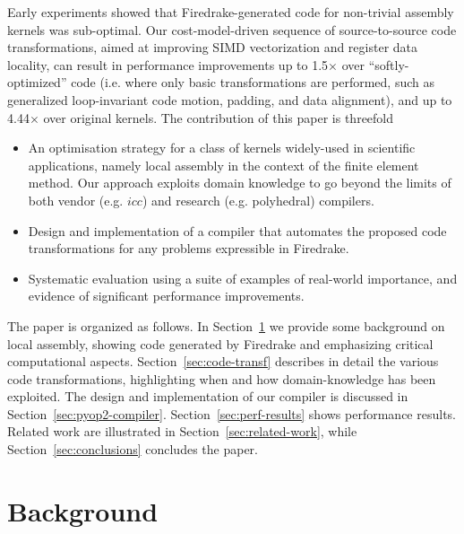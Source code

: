\documentclass[conference]{IEEEtran}
\begin{document}
Early experiments showed that Firedrake-generated code for non-trivial assembly kernels was sub-optimal. Our cost-model-driven sequence of source-to-source code transformations, aimed at improving SIMD vectorization and register data locality, can result in performance improvements up to 1.5$\times$ over ``softly-optimized'' code (i.e. where only basic transformations are performed, such as generalized loop-invariant code motion, padding, and data alignment), and up to 4.44$\times$ over original kernels. The contribution of this paper is threefold
\begin{itemize}
\item An optimisation strategy for a class of kernels widely-used in scientific applications, namely local assembly in the context of the finite element method. Our approach exploits domain knowledge to go beyond the limits of both vendor (e.g. $icc$) and research (e.g. polyhedral) compilers.
\item Design and implementation of a compiler that automates the proposed code transformations for any problems expressible in Firedrake.
\item Systematic evaluation using a suite of examples of real-world importance, and evidence of significant performance improvements.
\end{itemize}

The paper is organized as follows. In Section~\ref{sec:background} we provide some background on local assembly, showing code generated by Firedrake and emphasizing critical computational aspects. Section~\ref{sec:code-transf} describes in detail the various code transformations, highlighting when and how domain-knowledge has been exploited. The design and implementation of our compiler is discussed in Section~\ref{sec:pyop2-compiler}. Section~\ref{sec:perf-results} shows performance results. Related work are illustrated in Section~\ref{sec:related-work}, while Section~\ref{sec:conclusions} concludes the paper.



\section{Background}
\label{sec:background}
\end{document}

